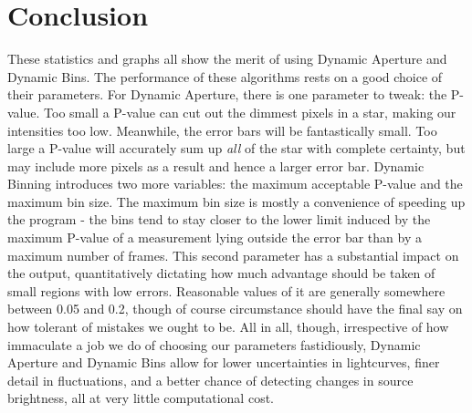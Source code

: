 \documentclass[12pt]{article}
\begin{document}
\section{Conclusion}
\indent \indent These statistics and graphs all show the merit of using Dynamic Aperture and Dynamic Bins. The performance of these algorithms rests on a good choice of their parameters. For Dynamic Aperture, there is one parameter to tweak: the P-value. Too small a P-value can cut out the dimmest pixels in a star, making our intensities too low. Meanwhile, the error bars will be fantastically small. Too large a P-value will accurately sum up \textit{all} of the star with complete certainty, but may include more pixels as a result and hence a larger error bar. Dynamic Binning introduces two more variables: the maximum acceptable P-value and the maximum bin size. The maximum bin size is mostly a convenience of speeding up the program - the bins tend to stay closer to the lower limit induced by the maximum P-value of a measurement lying outside the error bar than by a maximum number of frames. This second parameter has a substantial impact on the output, quantitatively dictating how much advantage should be taken of small regions with low errors. Reasonable values of it are generally somewhere between 0.05 and 0.2, though of course circumstance should have the final say on how tolerant of mistakes we ought to be. All in all, though, irrespective of how immaculate a job we do of choosing our parameters fastidiously, Dynamic Aperture and Dynamic Bins allow for lower uncertainties in lightcurves, finer detail in fluctuations, and a better chance of detecting changes in source brightness, all at very little computational cost.
\end{document}
